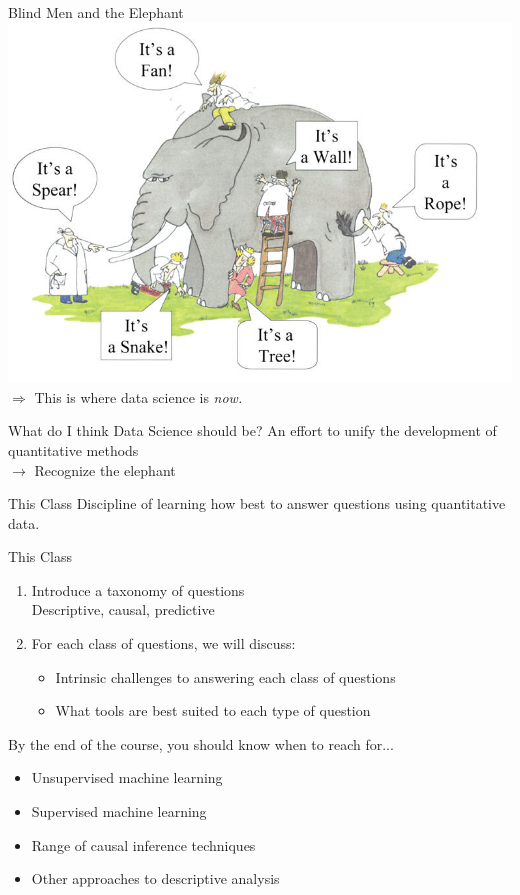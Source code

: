 \documentclass[11pt]{beamer}
\begin{document}
  \begin{frame}[c]{Blind Men and the Elephant}
  \pause \includegraphics[width=\textwidth]{blindmenelephant.jpg}
  \pause $\Rightarrow$ This is where data science is \emph{now.}
  \end{frame}
  
  \begin{frame}[c]{What do I think Data Science should be?}
  \pause An effort to unify the development of quantitative methods \\
  \pause $\rightarrow$ Recognize the elephant
  \end{frame}
  
  \begin{frame}[c]{This Class}
  Discipline of learning how best to \alert{answer questions} using \alert{quantitative data.}
  \end{frame}
  
  \begin{frame}[c]{This Class}
  \begin{enumerate}
    \item Introduce a taxonomy of questions \\
    {\color{gray} Descriptive, causal, predictive}
    \pause \item \alert{For each class of questions}, we will discuss:
    \begin{itemize}
      \item Intrinsic challenges to answering each class of questions
      \item What tools are best suited to each type of question
    \end{itemize}
  \end{enumerate}
    \pause   By the end of the course, you should know when to reach for...
    \begin{itemize}
      \pause \item Unsupervised machine learning
      \item Supervised machine learning
      \item Range of causal inference techniques
      \item Other approaches to descriptive analysis
    \end{itemize}
  \end{frame}
  
\end{document}
